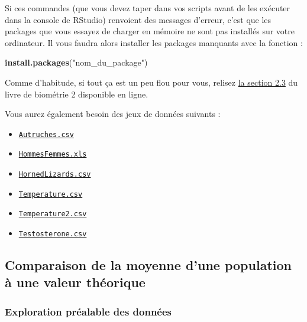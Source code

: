 \documentclass[
  a4paper,
]{article}
\newenvironment{Shaded}{\begin{snugshade}}{\end{snugshade}}
\newcommand{\KeywordTok}[1]{\textcolor[rgb]{0.12,0.11,0.11}{\textbf{#1}}}
\newcommand{\NormalTok}[1]{\textcolor[rgb]{0.12,0.11,0.11}{#1}}
\newcommand{\StringTok}[1]{\textcolor[rgb]{0.75,0.01,0.01}{#1}}
\providecommand{\tightlist}{%
  \setlength{\itemsep}{0pt}\setlength{\parskip}{0pt}}
\begin{document}
Si ces commandes (que vous devez taper dans vos scripts avant de les exécuter dans la console de RStudio) renvoient des messages d'erreur, c'est que les packages que vous essayez de charger en mémoire ne sont pas installés sur votre ordinateur. Il vous faudra alors installer les packages manquants avec la fonction :

\begin{Shaded}
\begin{Highlighting}[]
\KeywordTok{install.packages}\NormalTok{(}\StringTok{"nom_du_package"}\NormalTok{)}
\end{Highlighting}
\end{Shaded}

Comme d'habitude, si tout ça est un peu flou pour vous, relisez \href{https://besibo.github.io/Biometrie2/bases.html\#charger-un-package-en-memoire}{la section 2.3} du livre de biométrie 2 disponible en ligne.

Vous aurez également besoin des jeux de données suivants :

\begin{itemize}
\tightlist
\item
  \href{https://besibo.github.io/Biometrie3/data/Autruches.csv}{\texttt{Autruches.csv}}
\item
  \href{https://besibo.github.io/Biometrie3/data/HommesFemmes.xls}{\texttt{HommesFemmes.xls}}
\item
  \href{https://besibo.github.io/Biometrie3/data/HornedLizards.csv}{\texttt{HornedLizards.csv}}
\item
  \href{https://besibo.github.io/Biometrie3/data/Temperature.csv}{\texttt{Temperature.csv}}
\item
  \href{https://besibo.github.io/Biometrie3/data/Temperature2.csv}{\texttt{Temperature2.csv}}
\item
  \href{https://besibo.github.io/Biometrie3/data/Testosterone.csv}{\texttt{Testosterone.csv}}
\end{itemize}

\hypertarget{comparaison-de-la-moyenne-dune-population-uxe0-une-valeur-thuxe9orique}{%
\subsection{Comparaison de la moyenne d'une population à une valeur théorique}\label{comparaison-de-la-moyenne-dune-population-uxe0-une-valeur-thuxe9orique}}

\hypertarget{Explo}{%
\subsubsection{Exploration préalable des données}\label{Explo}}
\end{document}
